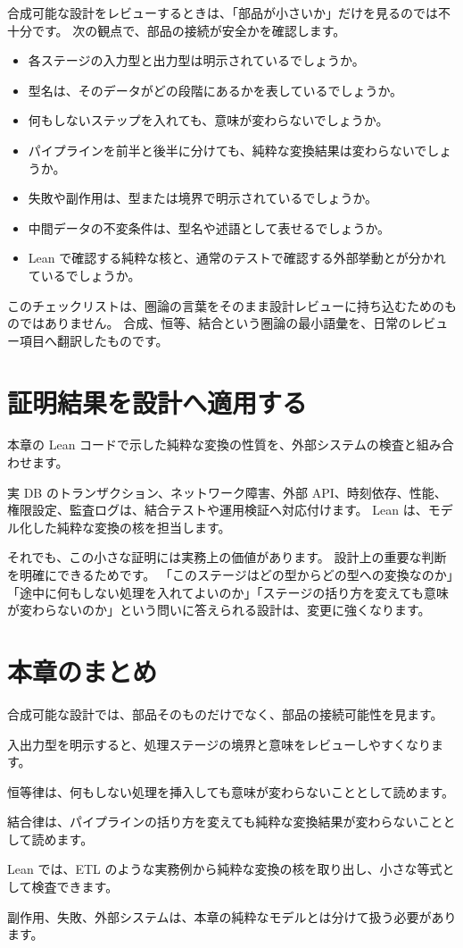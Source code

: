 合成可能な設計をレビューするときは、「部品が小さいか」だけを見るのでは不十分です。
次の観点で、部品の接続が安全かを確認します。

\begin{itemize}
\item 各ステージの入力型と出力型は明示されているでしょうか。
\item 型名は、そのデータがどの段階にあるかを表しているでしょうか。
\item 何もしないステップを入れても、意味が変わらないでしょうか。
\item パイプラインを前半と後半に分けても、純粋な変換結果は変わらないでしょうか。
\item 失敗や副作用は、型または境界で明示されているでしょうか。
\item 中間データの不変条件は、型名や述語として表せるでしょうか。
\item Lean で確認する純粋な核と、通常のテストで確認する外部挙動とが分かれているでしょうか。
\end{itemize}

このチェックリストは、圏論の言葉をそのまま設計レビューに持ち込むためのものではありません。
合成、恒等、結合という圏論の最小語彙を、日常のレビュー項目へ翻訳したものです。

\section{証明結果を設計へ適用する}

本章の Lean コードで示した純粋な変換の性質を、外部システムの検査と組み合わせます。

実 DB のトランザクション、ネットワーク障害、外部 API、時刻依存、性能、権限設定、監査ログは、結合テストや運用検証へ対応付けます。
Lean は、モデル化した純粋な変換の核を担当します。

それでも、この小さな証明には実務上の価値があります。
設計上の重要な判断を明確にできるためです。
「このステージはどの型からどの型への変換なのか」「途中に何もしない処理を入れてよいのか」「ステージの括り方を変えても意味が変わらないのか」という問いに答えられる設計は、変更に強くなります。

\section{本章のまとめ}

合成可能な設計では、部品そのものだけでなく、部品の接続可能性を見ます。

入出力型を明示すると、処理ステージの境界と意味をレビューしやすくなります。

恒等律は、何もしない処理を挿入しても意味が変わらないこととして読めます。

結合律は、パイプラインの括り方を変えても純粋な変換結果が変わらないこととして読めます。

Lean では、ETL のような実務例から純粋な変換の核を取り出し、小さな等式として検査できます。

副作用、失敗、外部システムは、本章の純粋なモデルとは分けて扱う必要があります。
